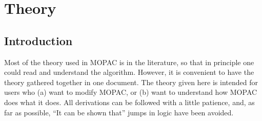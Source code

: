 \chapter{Theory}\label{theory}
\section{Introduction}
Most of the theory used in MOPAC is in the literature, so that in principle one
could read and understand the algorithm.  However, it is convenient to have the
theory gathered together in one document.  The theory given here is intended
for users who (a) want to modify MOPAC, or (b) want to understand how MOPAC
does what it does.  All derivations can be followed with a little patience,
and, as far as possible, ``It can be shown that'' jumps in logic have been
avoided.

%
%

















